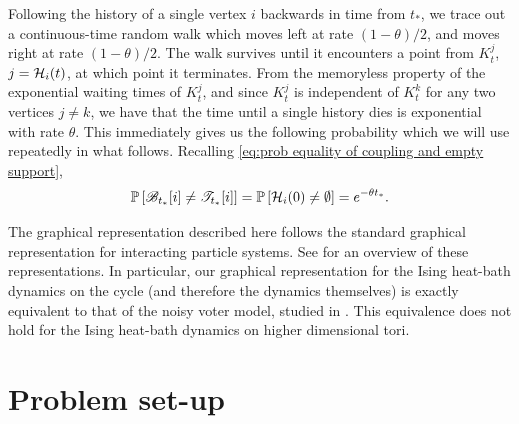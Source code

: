 	Following the history of a single vertex $i$ backwards in time from $t_*$, we trace out a continuous-time random walk which moves left at rate $(1 - \theta)/2$, and moves right at rate $(1 - \theta)/2$. The walk survives until it encounters a point from $K_t^j$, $j = \mathcal{H}_i(t)$, at which point it terminates. From the memoryless property of the exponential waiting times of $K_t^j$, and since $K_t^j$ is independent of $K_t^k$ for any two vertices $j \neq k$, we have that the time until a single history dies is exponential with rate $\theta$.
	This immediately gives us the following probability which we will use repeatedly in what follows. Recalling \eqref{eq:prob equality of coupling and empty support},
	\begin{equation}
		\mathbb{P} \left[ \mathscr{B}_{t_*}[i] \neq \mathscr{T}_{t_*}[i] \right] = 
		\mathbb{P} \left[ \mathcal{H}_i(0) \neq \emptyset \right] = 
		e^{-\theta t_*}.
		\label{eq:1D bernoulli prob}
	\end{equation}

	\begin{remark}
		The graphical representation described here follows the standard graphical representation for interacting particle systems. See \cite[Chapter 3, Section 6]{Liggett1985-ke} for an overview of these representations. In particular, our graphical representation for the Ising heat-bath dynamics on the cycle (and therefore the dynamics themselves) is exactly equivalent to that of the noisy voter model, studied in \cite{Granovsky1995-ds}. This equivalence does not hold for the Ising heat-bath dynamics on higher dimensional tori.
 	\end{remark}

	\section{Problem set-up}
	\label{sec:1D problem setup}


